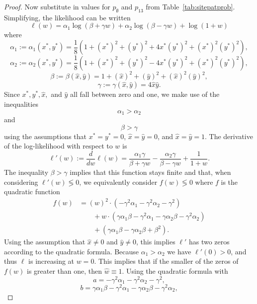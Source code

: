 \begin{proof}
Now substitute in values for $p_{\emptyset}$ and $p_{13}$ from Table~\ref{tab:sitepatprob}.
Simplifying, the likelihood can be written
\[
\ell(w) = \alpha_1\log(\beta+\gamma w) + \alpha_2\log(\beta-\gamma w) + \log(1+w)
\]
where
\[
\alpha_1 := \alpha_1(x^*, y^*) = \frac{1}{8} \left(1+(x^*)^2+(y^*)^2+4x^*(y^*)^2+(x^*)^2(y^*)^2\right),
\]
\[
\alpha_2 := \alpha_2(x^*, y^*) = \frac{1}{8}\left(1+(x^*)^2+(y^*)^2-4x^*(y^*)^2+(x^*)^2(y^*)^2\right),
\]
\[
\beta := \beta(\hat{x}, \hat{y}) = 1+(\hat{x})^2+(\hat{y})^2+(\hat{x})^2(\hat{y})^2,
\]
\[
\gamma := \gamma(\hat{x}, \hat{y}) = 4\hat{x}\hat{y}.
\]
Since $x^*,y^*,\hat{x},$ and $\hat{y}$ all fall between zero and one, we make use of the inequalities
\[
\alpha_1 > \alpha_2
\]
and
\[
\beta > \gamma
\]
using the assumptions that $x^*=y^*=0$, $\hat{x}=\hat{y}=0$, and $\hat{x}=\hat{y}=1$.
The derivative of the log-likelihood with respect to $w$ is
\[
\ell'(w) := \frac{d}{dw} \ell(w) = \frac{\alpha_1 \gamma}{\beta+\gamma w} - \frac{\alpha_2 \gamma}{\beta-\gamma w} + \frac{1}{1+w}.
\]
The inequality $\beta > \gamma$ implies that this function stays finite and that, when considering $\ell'(w) \lessgtr 0$, we equivalently consider $f(w) \lessgtr 0$ where $f$ is the quadratic function
\begin{align*}
f(w) &= (w)^2\cdot(-\gamma^2\alpha_1-\gamma^2\alpha_2-\gamma^2) \\
      &\qquad + w\cdot(\gamma\alpha_1\beta-\gamma^2\alpha_1-\gamma\alpha_2\beta-\gamma^2\alpha_2) \\
      &\qquad + (\gamma\alpha_1\beta-\gamma\alpha_2\beta+\beta^2).
\end{align*}
Using the assumption that $\hat{x}\neq 0$ and $\hat{y}\neq 0$, this implies $\ell'$ has two zeros according to the quadratic formula.
Because $\alpha_1 > \alpha_2$ we have $\ell'(0) > 0$, and thus $\ell$ is increasing at $w=0$.
This implies that if the smaller of the zeros of $f(w)$ is greater than one, then $\hat{w} \equiv 1$.
Using the quadratic formula with
\[
a = -\gamma^2 \alpha_1 - \gamma^2 \alpha_2 - \gamma^2,
\]
\[
b = \gamma \alpha_1 \beta - \gamma^2\alpha_1 - \gamma \alpha_2 \beta - \gamma^2 \alpha_2,
\]
\end{proof}
